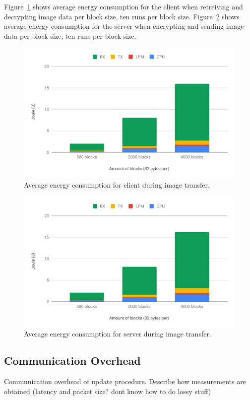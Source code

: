 \documentclass[0-thesis.tex]{subfiles}
\begin{document}
Figure~\ref{fig:client-image-energy} shows average energy consumption for the client when
retreiving and decrypting image data per block size, ten runs per block size.
Figure~\ref{fig:server-image-energy} shows average energy consumption for the server when
encrypting and sending image data per block size, ten runs per block size.

\begin{figure}
    \caption{Average energy consumption for client during image transfer.}
    \label{fig:client-image-energy}
    \includegraphics[scale=0.8]{images/client-image-energy.pdf}
\end{figure}

\begin{figure}
    \caption{Average energy consumption for server during image transfer.}
    \label{fig:server-image-energy}
    \includegraphics[scale=0.8]{images/server-image-energy.pdf}
\end{figure}

\subsection{Communication Overhead}
\label{ssec:communication-overhead}
Communication overhead of update procedure.
Describe how measurements are obtained (latency and packet size? dont know how to do lossy
stuff)
\end{document}
